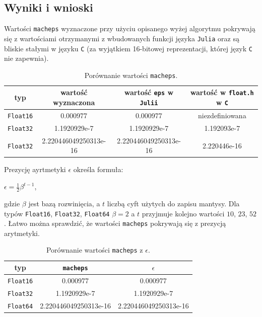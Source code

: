 \documentclass{article}
\begin{document}
\subsection{Wyniki i wnioski}
Wartości \texttt{macheps} wyznaczone przy użyciu opisanego wyżej algorytmu pokrywają się z wartościami otrzymanymi z wbudowanych funkcji języka \texttt{Julia} oraz są bliskie stałymi w języku \texttt{C} (za wyjątkiem 16-bitowej reprezentacji, której język \texttt{C} nie zapewnia).
\begin{table}[h!]
    \centering
    \begin{tabular}{ |c|c|c|c| } 
    \hline
    typ & wartość wyznaczona & wartość \texttt{eps} w \texttt{Julii} & wartość w \texttt{float.h} w \texttt{C} \\ 
    \hline
    \texttt{Float16} & 0.000977 & 0.000977 & niezdefiniowana \\ 
    \hline
    \texttt{Float32} & 1.1920929e-7 & 1.1920929e-7 & 1.192093e-7 \\ 
    \hline
    \texttt{Float32} & 2.220446049250313e-16 & 2.220446049250313e-16 & 2.220446e-16 \\ 
    \hline
    \end{tabular}
    \caption{Porównanie wartości \texttt{macheps}.}
\end{table}
\newline
Prezycję ayrtmetyki $\epsilon$ określa formuła: 
\begin{center}
    $\epsilon = \frac{1}{2} \beta^{t - 1}$,
\end{center}
gdzie $\beta$ jest bazą rozwinięcia, a $t$ liczbą cyft użytych do zapisu mantysy. Dla typów \texttt{Float16}, \texttt{Float32}, \texttt{Float64} $\beta = 2$ a $t$ przyjmuje kolejno wartości $10$, $23$, $52$. Łatwo można sprawdzić, że wartości \texttt{macheps} pokrywają się \newline z prezycją arytmetyki.
\newline
\begin{table}[h!]
    \centering
    \begin{tabular}{ |c|c|c| }
        \hline
        typ & \texttt{macheps} & $\epsilon$ \\
        \hline
        \texttt{Float16} & 0.000977 & 0.000977 \\
        \hline 
        \texttt{Float32} & 1.1920929e-7 & 1.1920929e-7 \\
        \hline
        \texttt{Float64} & 2.220446049250313e-16 & 2.220446049250313e-16 \\
        \hline
    \end{tabular}
    \caption{Porównanie wartości \texttt{macheps} z $\epsilon$.}
\end{table}
\end{document}
